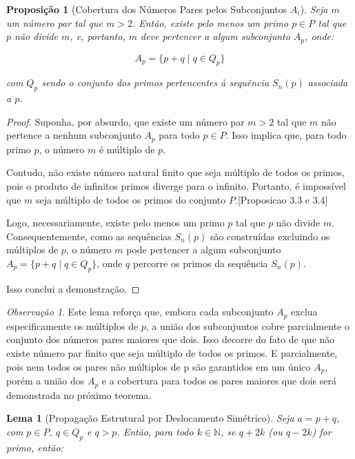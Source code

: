 \documentclass[a4paper,11pt]{article}
\newtheorem{lemma}[theorem]{Lema}
\newtheorem{proposition}[theorem]{Proposição}
\theoremstyle{definition}
\theoremstyle{remark}
\newtheorem{remark}[theorem]{Observação}
\begin{document}
\begin{otherlanguage}{brazil}
	\begin{proposition}[Cobertura dos Números Pares pelos Subconjuntos \(A_i\)]
		Seja \(m\) um número par tal que \(m > 2\). Então, existe pelo menos um primo \(p \in P\) tal que \(p\) não divide \(m\), e, portanto, \(m\) deve pertencer a algum subconjunto \(A_p\), onde:
		
		\[
		A_p = \{p + q \mid q \in Q_p\}
		\]
		
		com \(Q_p\) sendo o conjunto dos primos pertencentes à sequência \(S_n(p)\) associada a \(p\).
	\end{proposition}
	
	\begin{proof}
		Suponha, por absurdo, que existe um número par \(m > 2\) tal que \(m\) não pertence a nenhum subconjunto \(A_p\) para todo \(p \in P\). Isso implica que, para todo primo \(p\), o número \(m\) é múltiplo de \(p\).
		
		Contudo, não existe número natural finito que seja múltiplo de todos os primos, pois o produto de infinitos primos diverge para o infinito. Portanto, é impossível que \(m\) seja múltiplo de todos os primos do conjunto \(P\).[Proposicao 3.3 e 3.4]
		
		Logo, necessariamente, existe pelo menos um primo \(p\) tal que \(p\) não divide \(m\). Consequentemente, como as sequências \(S_n(p)\) são construídas excluindo os múltiplos de \(p\), o número \(m\) pode pertencer a algum subconjunto \(A_p = \{p + q \mid q \in Q_p\}\), onde \(q\) percorre os primos da sequência \(S_n(p)\).
		
		Isso conclui a demonstração.
	\end{proof}
	\begin{remark}
		Este lema reforça que, embora cada subconjunto \(A_p\) exclua especificamente os múltiplos de \(p\), a união dos subconjuntos cobre parcialmente o conjunto dos números pares maiores que dois. Isso decorre do fato de que não existe número par finito que seja múltiplo de todos os primos. E parcialmente, pois nem todos os pares não múltiplos de p são garantidos em um único \(A_p\), porém a união dos \(A_p\) e a cobertura para todos os pares maiores que dois será demonstrada no próximo teorema.
	\end{remark}
	
	\begin{lemma}[Propagação Estrutural por Deslocamento Simétrico]
		Seja \(a = p + q\), com \(p \in P\), \(q \in Q_p\) e \(q > p\). Então, para todo \(k \in \mathbb{N}\), se \(q + 2k\) (ou \(q - 2k\)) for primo, então:
		

\end{lemma}
\end{otherlanguage}
\end{document}
